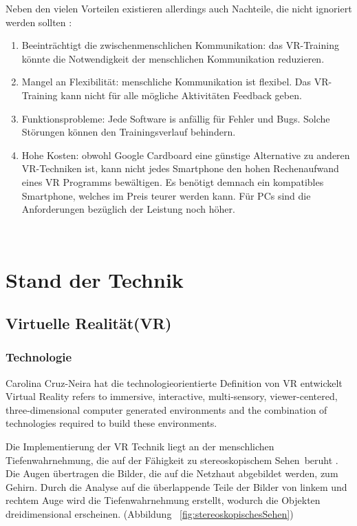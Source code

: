Neben den vielen Vorteilen existieren allerdings auch Nachteile, die nicht ignoriert werden sollten \citep{17}:

\begin{enumerate}
\item Beeinträchtigt die zwischenmenschlichen Kommunikation: das VR-Training könnte die Notwendigkeit der menschlichen Kommunikation reduzieren.
\item Mangel an Flexibilität: menschliche Kommunikation ist flexibel. Das VR-Training kann nicht für alle mögliche Aktivitäten Feedback geben.
\item Funktionsprobleme: Jede Software is anfällig für Fehler und Bugs. Solche Störungen können den Trainingsverlauf behindern.
\item Hohe Kosten: obwohl Google Cardboard eine günstige Alternative zu anderen VR-Techniken ist, kann nicht jedes Smartphone den hohen Rechenaufwand eines VR Programms bewältigen. Es benötigt demnach ein kompatibles Smartphone, welches im Preis teurer werden kann. Für PCs sind die Anforderungen bezüglich der Leistung noch höher.
\end{enumerate}\

\section{Stand der Technik}
 \subsection{Virtuelle Realität(VR)}
  \subsubsection{Technologie}
Carolina Cruz-Neira \citep{19} hat die technologieorientierte Definition von VR entwickelt \glqq Virtual Reality refers to immersive, interactive, multi-sensory, viewer-centered, three-dimensional computer generated environments and the combination of technologies required to build these environments.\grqq\
  
Die Implementierung der VR Technik liegt an der menschlichen Tiefenwahrnehmung, die auf der Fähigkeit zu \glqq stereoskopischem Sehen\grqq\ beruht \citep{20}. Die Augen übertragen die Bilder, die auf die Netzhaut abgebildet werden, zum Gehirn. Durch die Analyse auf die überlappende Teile der Bilder von linkem und rechtem Auge wird die Tiefenwahrnehmung erstellt, wodurch die Objekten dreidimensional erscheinen. (Abbildung ~\ref{fig:stereoskopischesSehen})

